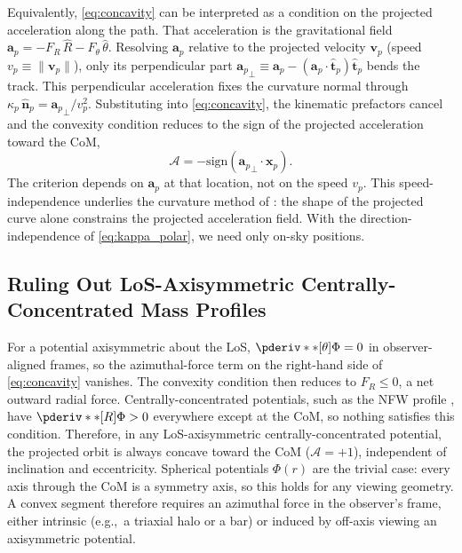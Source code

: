 \documentclass[linenumbers,twocolumn]{aastex701}
\renewcommand{\mbf}[1]{\boldsymbol{#1}}
\newcommand{\xvec}{\mbf{x}}  %
\newcommand{\vel}{\mbf{v}}  %
\newcommand{\avec}{\mbf{a}}  %
\newcommand{\that}{\hat{\mbf{t}}}  %
\newcommand{\nhat}{\hat{\mbf{n}}}  %
\newcommand{\speed}{v}  %
\newcommand{\curvature}{\kappa}  %
\newcommand{\proj}[1]{{#1}_{p}}  %
\newcommand{\xsky}{\proj{\xvec}}  %
\newcommand{\vsky}{\proj{\vel}}  %
\newcommand{\asky}{\proj{\avec}}  %
\newcommand{\tphat}{\proj{\that}}  %
\newcommand{\nphat}{\proj{\nhat}}  %
\newcommand{\curvaturesky}{\proj{\curvature}}  %
\newcommand{\speedsky}{\proj{\speed}}
\begin{document}
    Equivalently, \cref{eq:concavity} can be interpreted as a condition on the projected acceleration along the path. %
    That acceleration is the gravitational field $\asky = -F_R\,\hat{R} - F_\theta\,\hat{\theta}$. %
    Resolving $\asky$ relative to the projected velocity $\vsky$ (speed $\speedsky \equiv \|\vsky\|$), only its perpendicular part ${\asky}_{\perp} \equiv \asky - (\asky\cdot\tphat)\tphat$ bends the track. %
    This perpendicular acceleration fixes the curvature normal through $\curvaturesky\,\nphat = {\asky}_{\perp}/\speedsky^2$. %
    Substituting into \cref{eq:concavity}, the kinematic prefactors cancel and the convexity condition reduces to the sign of the projected acceleration toward the \gls{CoM}, %
    \begin{equation}\label{eq:theory:path:orbit:alignment_from_a}
        \mathcal{A}
        = -\mathrm{sign}\left({\asky}_{\perp}\cdot\xsky\right). %
    \end{equation}
    The criterion depends on $\asky$ at that location, not on the speed $\speedsky$. %
    This speed-independence underlies the curvature method of : the shape of the projected curve alone constrains the projected acceleration field. %
    With the direction-independence of \cref{eq:kappa_polar}, we need only on-sky positions. %

    \subsection[Ruling Out LoS-Axisymmetric Centrally-Concentrated Mass Profiles]{Ruling Out \gls{LoS}-Axisymmetric Centrally-Concentrated Mass Profiles}\label{sec:diagnostic:axisymmetric}

        For a potential axisymmetric about the \gls{LoS}, $\pderiv**[\theta]{\Phi} = 0$ in observer-aligned frames, so the azimuthal-force term on the right-hand side of \cref{eq:concavity} vanishes. %
        The convexity condition then reduces to $F_R \leq 0$, a net outward radial force. %
        Centrally-concentrated potentials, such as the \gls{NFW} profile \citep{Navarro+:1996:StructureColdDark,Navarro+:1997:UniversalDensityProfile}, have $\pderiv**[R]{\Phi} > 0$ everywhere except at the \gls{CoM}, so nothing satisfies this condition. %
        Therefore, in any \gls{LoS}-axisymmetric centrally-concentrated potential, the projected orbit is always concave toward the \gls{CoM} ($\mathcal{A}=+1$), independent of inclination and eccentricity. %
        Spherical potentials $\Phi(r)$ are the trivial case: every axis through the \gls{CoM} is a symmetry axis, so this holds for any viewing geometry. %
        A convex segment therefore requires an azimuthal force in the observer's frame, either intrinsic (e.g.,\ a triaxial halo or a bar) or induced by off-axis viewing an axisymmetric potential. %
\end{document}
